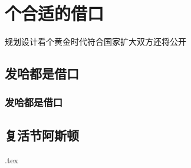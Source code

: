 \documentclass[hidelinks]{ctexart}
\begin{document}
\section{个合适的借口} %
\label{sec:个合适的借口}

规划设计看个黄金时代符合国家扩大双方还将公开

\subsection{发哈都是借口} %
\label{sub:发哈都是借口}

\subsubsection{发哈都是借口} %
\label{ssub:发哈都是借口}

\zhlipsum[1-6]


\subsection{复活节阿斯顿} %
\label{sub:复活节阿斯顿}

\zhlipsum[4-7]
\jobname.tex



\end{document}
